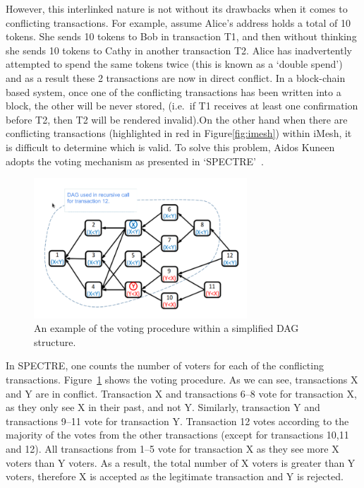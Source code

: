\documentclass[a4paper,10pt,twocolumn]{article}
\begin{document}
However, this interlinked nature is not without its drawbacks when it comes to conflicting transactions. For example, assume Alice's 
address holds a total of 10 tokens. She sends 10 tokens to Bob in transaction T1, and then without thinking she sends 10 tokens to Cathy 
in another transaction T2. Alice has inadvertently attempted to spend the same tokens twice (this is known as a `double spend')
and as a result these 2 transactions are now in direct conflict. In a block-chain based system, once one of the conflicting transactions 
has been written into a block, the other will be never stored, (i.e.\ if T1 receives at least one confirmation before T2, then T2 will be 
rendered invalid).On the other hand when there are conflicting transactions (highlighted in red in Figure\ref{fig:imesh}) within iMesh, 
it is difficult to determine which is valid. To solve this problem, Aidos Kuneen adopts the voting mechanism as presented in 
`SPECTRE'~\cite{spectre}.

\begin{figure}[ht]
	\begin{center}
	\includegraphics[width=80mm]{spectre.png}
	  \caption{An example of the voting procedure within a simplified DAG structure.}
    \label{fig:spectre}
	\end{center}
 \end{figure}

 In SPECTRE, one counts the number of voters for each of the conflicting transactions. Figure~\ref{fig:spectre} shows the voting 
 procedure. As we can see, transactions X and Y are in conflict. Transaction X and transactions 6--8 vote for transaction X, as they 
 only see X in their past, and not Y. Similarly, transaction Y and transactions 9--11 vote for transaction Y. Transaction 12 votes 
 according to the majority of the votes from the other transactions (except for transactions 10,11 and 12). All transactions from 1--5 
 vote for transaction X as they see more X voters than Y voters. As a result, the total number of X voters is greater than Y voters, 
 therefore X is accepted as the legitimate transaction and Y is rejected. 
\end{document}
